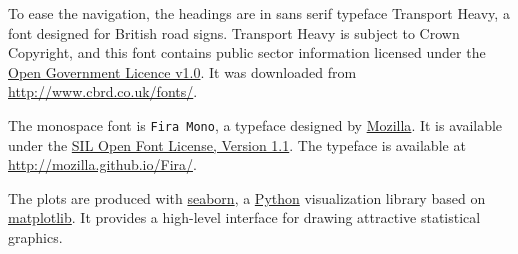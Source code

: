 \documentclass[11pt,a4paper,english,oneside]{book}
\begin{document}
To ease the navigation, the headings are in sans serif typeface {\sffamily \scriptsize Transport Heavy}, a font designed for British road signs. Transport Heavy is subject to Crown Copyright, and this font contains public sector information licensed under the \href{http://www.nationalarchives.gov.uk/doc/open-government-licence/version/1/}{Open Government Licence v1.0}. It was downloaded from \url{http://www.cbrd.co.uk/fonts/}.

The monospace font is \texttt{Fira Mono}, a typeface designed by \href{https://www.mozilla.org/}{Mozilla}. It is available under the \href{http://scripts.sil.org/OFL}{SIL Open Font License, Version 1.1}. The typeface is available at  \url{http://mozilla.github.io/Fira/}.

The plots are produced with \href{http://seaborn.pydata.org/}{seaborn}, a \href{https://www.python.org/}{Python} visualization library based on \href{http://matplotlib.org/}{matplotlib}. It provides a high-level interface for drawing attractive statistical graphics.
\end{document}
